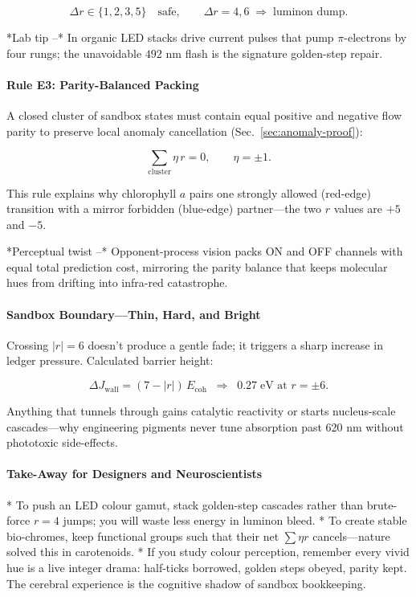 \documentclass[11pt,oneside]{book}
\begin{document}
{\[
   \Delta r\in\{1,2,3,5\}
   \quad\text{safe},\qquad
   \Delta r=4,6\;\Rightarrow\;\text{luminon dump}.
\]

*Lab tip –*  In organic LED stacks drive current pulses that pump
$\pi$-electrons by four rungs; the unavoidable $492$ nm flash is the
signature golden-step repair.

\paragraph*{Rule E3: Parity-Balanced Packing}

A closed cluster of sandbox states must contain equal positive and
negative flow parity to preserve local anomaly cancellation
(Sec.~\ref{sec:anomaly-proof}):

\[
   \sum_{\mathrm{cluster}} \eta\,r = 0,\qquad
   \eta = \pm1 .
\]

This rule explains why chlorophyll $a$ pairs one strongly allowed
(red-edge) transition with a mirror forbidden
(blue-edge) partner—the two \(r\) values are
\( +5\) and \(-5\).

*Perceptual twist –*  Opponent-process vision packs ON and OFF channels
with equal total prediction cost, mirroring the parity balance that keeps
molecular hues from drifting into infra-red catastrophe.

\paragraph*{Sandbox Boundary—Thin, Hard, and Bright}

Crossing \(|r|=6\) doesn’t produce a gentle fade; it triggers a sharp
increase in ledger pressure.  
Calculated barrier height:

\[
   \Delta J_{\text{wall}}
   = (7 - |r|)\,E_{\text{coh}}
   \;\;\Longrightarrow\;\;
   0.27\;\text{eV at }r=\pm6 .
\]

Anything that tunnels through gains catalytic reactivity or starts
nucleus-scale cascades—why engineering pigments never tune absorption
past 620 nm without phototoxic side-effects.

\paragraph*{Take-Away for Designers and Neuroscientists}

* To push an LED colour gamut, stack golden-step cascades rather than
  brute-force $r=4$ jumps; you will waste less energy in luminon bleed.
* To create stable bio-chromes, keep functional groups such that their
  net \(\sum\eta r\) cancels—nature solved this in carotenoids.
* If you study colour perception, remember every vivid hue is a live
  integer drama: half-ticks borrowed, golden steps obeyed, parity kept.
  The cerebral experience is the cognitive shadow of sandbox bookkeeping.

}
\end{document}
